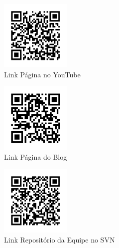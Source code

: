 \documentclass[
    12pt,               %
    openright,          %
    oneside,
    a4paper,            %
    BIBLATEX,           %
    TODO,               %
    english,            %
    brazil              %
    ]{ifsp-spo-inf-ctds}
\begin{document}
    \begin{figure}[htb!]
        \centering
        \includegraphics [width=0.3\textwidth]{qrcode/qrcode_YT.png}
        \caption{Link Página no YouTube}
        \label{fig:qrcode_YT}
    \end{figure}
    
    \begin{figure}[htb!]
        \centering
        \includegraphics[width=0.3\textwidth]{qrcode/qrcode_BLOG.png}
        \caption{Link Página do Blog}
        \label{fig:qrcode_BLOG}
    \end{figure}
    
    \begin{figure}[htb!]
        \centering
        \includegraphics[width=0.3\textwidth]{qrcode/svn.png}
        \caption{Link Repositório da Equipe no SVN}
        \label{fig:svn}
    \end{figure}



\postextual


%



\end{document}
